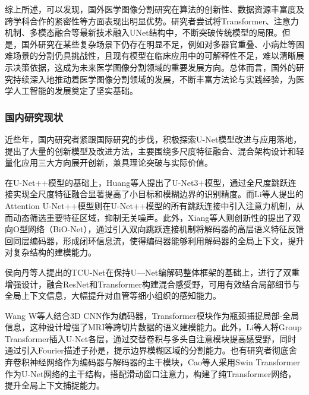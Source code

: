 综上所述，可以发现，国外医学图像分割研究在算法的创新性、数据资源丰富度及跨学科合作的紧密性等方面表现出明显优势。研究者尝试将Transformer、注意力机制、多模态融合等最新技术融入UNet结构中，不断突破传统模型的局限。但是，国外研究在某些复杂场景下仍存在明显不足，例如对多器官重叠、小病灶等困难场景的分割仍具挑战性，且现有模型在临床应用中的可解释性不足，难以清晰展示决策依据，这成为未来医学图像分割领域的重要发展方向。总体而言，国外的研究持续深入地推动着医学图像分割领域的发展，不断丰富方法论与实践经验，为医学人工智能的发展奠定了坚实基础。

\subsubsection{国内研究现状}

近些年，国内研究者紧跟国际研究的步伐，积极探索U-Net模型改进与应用落地，提出了大量的创新模型及改进方法，主要围绕多尺度特征融合、混合架构设计和轻量化应用三大方向展开创新，兼具理论突破与实际价值。

在U-Net++模型的基础上，Huang等人\cite{huang2020}提出了U-Net3+模型，通过全尺度跳跃连接实现全尺度特征融合显著提高了小目标和模糊边界的识别精度。而Li等人\cite{li2020}提出的Attention U-Net++模型则在U-Net++模型的所有跳跃连接中引入注意力机制，从而动态筛选重要特征区域，抑制无关噪声。此外，Xiang等人\cite{xiang2020}则创新性的提出了双向O型网络（BiO-Net），通过引入双向跳跃连接机制将解码器的高层语义特征反馈回同层编码器，形成闭环信息流，使得编码器能够利用解码器的全局上下文，提升对复杂结构的建模能力。

侯向丹等人\cite{HouXiangDan2023}提出的TCU-Net在保持U—Net编解码整体框架的基础上，进行了双重增强设计，融合ResNet和Transformer构建混合感受野，可用有效结合局部细节与全局上下文信息，大幅提升对血管等细小组织的感知能力。

Wang W等人\cite{wang2021}结合3D CNN作为编码器，Transformer模块作为瓶颈捕捉局部-全局信息，这种设计增强了MRI等跨切片数据的语义建模能力。此外，Li等人\cite{li2021}将Group Transformer插入U-Net各层，通过交替卷积与多头自注意模块提高感受野，同时通过引入Fourier描述子孙是，提示边界模糊区域的分割能力。也有研究者彻底舍弃卷积神经网络作为编码器与解码器的主干模块，Cao等人\cite{cao2021}采用Swin Transformer作为U-Net网络的主干结构，搭配滑动窗口注意力，构建了纯Transformer网络，提升全局上下文捕捉能力。

